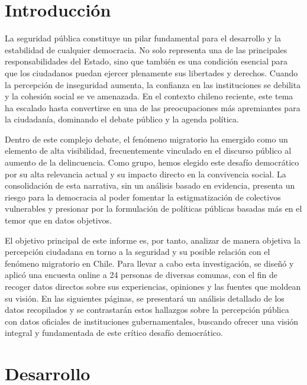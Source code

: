 \documentclass[12pt, a4paper]{article}
\begin{document}
\tableofcontents
\newpage

\section*{Introducción}

La seguridad pública constituye un pilar fundamental para el desarrollo y la estabilidad de cualquier democracia. No solo representa una de las principales responsabilidades del Estado, sino que también es una condición esencial para que los ciudadanos puedan ejercer plenamente sus libertades y derechos. Cuando la percepción de inseguridad aumenta, la confianza en las instituciones se debilita y la cohesión social se ve amenazada. En el contexto chileno reciente, este tema ha escalado hasta convertirse en una de las preocupaciones más apremiantes para la ciudadanía, dominando el debate público y la agenda política.

Dentro de este complejo debate, el fenómeno migratorio ha emergido como un elemento de alta visibilidad, frecuentemente vinculado en el discurso público al aumento de la delincuencia. Como grupo, hemos elegido este desafío democrático por su alta relevancia actual y su impacto directo en la convivencia social. La consolidación de esta narrativa, sin un análisis basado en evidencia, presenta un riesgo para la democracia al poder fomentar la estigmatización de colectivos vulnerables y presionar por la formulación de políticas públicas basadas más en el temor que en datos objetivos.

El objetivo principal de este informe es, por tanto, analizar de manera objetiva la percepción ciudadana en torno a la seguridad y su posible relación con el fenómeno migratorio en Chile. Para llevar a cabo esta investigación, se diseñó y aplicó una encuesta online a 24 personas de diversas comunas, con el fin de recoger datos directos sobre sus experiencias, opiniones y las fuentes que moldean su visión. En las siguientes páginas, se presentará un análisis detallado de los datos recopilados y se contrastarán estos hallazgos sobre la percepción pública con datos oficiales de instituciones gubernamentales, buscando ofrecer una visión integral y fundamentada de este crítico desafío democrático.
\newpage

\section{Desarrollo}
\end{document}
